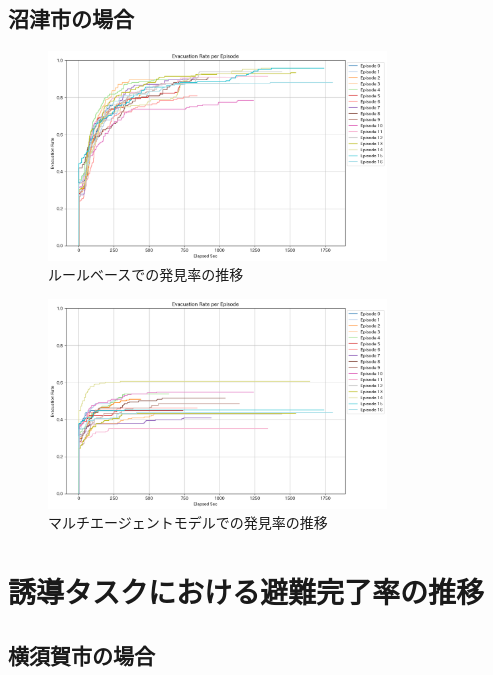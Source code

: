 \subsection{沼津市の場合}
\begin{figure}[H] 
  \centering 
  \includegraphics[width=0.8\textwidth]{Figures/NumazuSearch-RuleResult.png}
  \caption{ルールベースでの発見率の推移}
\end{figure}

\begin{figure}[H] 
  \centering 
  \includegraphics[width=0.8\textwidth]{Figures/NumazuSearch-AgentsResult.png}
  \caption{マルチエージェントモデルでの発見率の推移}
\end{figure}

\section{誘導タスクにおける避難完了率の推移}

\subsection{横須賀市の場合}

